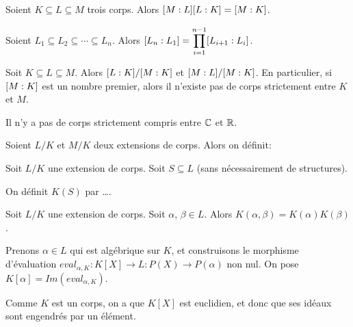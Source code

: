 \begin{proposition} 
	Soient $K \subseteq L \subseteq M$ trois corps. Alors
	$[M : L] [L : K] = [M : K]$.
\end{proposition}

\begin{proposition} 
	Soient $L_{1} \subseteq L_{2} \subseteq \cdots \subseteq L_{n}$.
	Alors $[L_{n} : L_{1}] =
	\displaystyle \prod_{i = 1}^{n - 1} [L_{i + 1} : L_{i}]$.
\end{proposition}

\begin{remarque}
	Soit $K \subseteq L \subseteq M$. Alors $[L : K] /
	[M : K]$ et $[M : L] /
	[M : K]$. En particulier, si $[M : K]$ est un
	nombre premier, alors il n'existe pas de corps strictement entre $K$ et $M$.
\end{remarque}

\begin{exercice}
	Il n'y a pas de corps strictement compris entre $\mathbb{C}$ et $\mathbb{R}$.
\end{exercice}

\begin{definition}
	Soient $L/K$ et $M/K$ deux extensions de corps. Alors on définit:
\end{definition}

\begin{definition}
	Soit $L/K$ une extension de corps. Soit $S \subseteq L$ (sans nécessairement
	de structures).

	On définit $K(S)$ par \ldots.
\end{definition}

\begin{proposition}
	Soit $L/K$ une extension de corps. Soit $\alpha$, $\beta \in L$.
	Alors $K(\alpha, \beta) = K(\alpha)K(\beta)$.
\end{proposition}

Prenons $\alpha \in L$ qui est algébrique sur $K$, et construisons le morphisme
d'évaluation $eval_{\alpha, K} : K[X] \rightarrow L : P(X) \rightarrow P(\alpha)$
non nul. On pose $K[\alpha] = Im(eval_{\alpha, K})$.

Comme $K$ est un corps, on a que $K[X]$ est euclidien, et donc que ses idéaux
sont engendrés par un élément.

